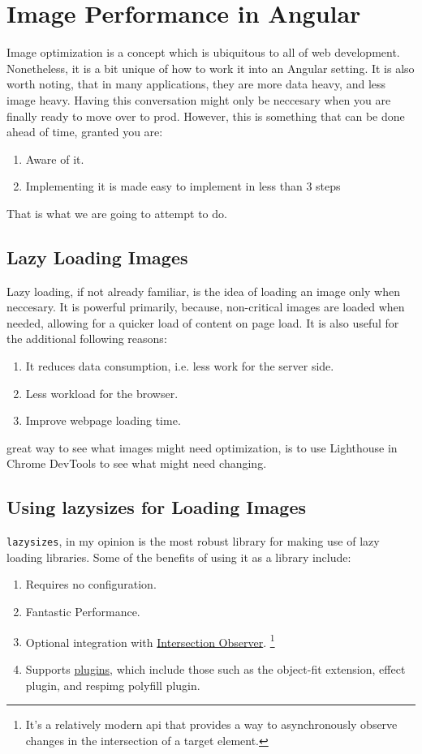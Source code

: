 \chapter{ Image Performance in Angular }

Image optimization is a concept which is ubiquitous to all of web development.
Nonetheless, it is a bit unique of how to work it into an Angular setting. It 
is also worth noting, that in many applications, they are more data heavy, and 
less image heavy. Having this conversation might only be neccesary when you 
are finally ready to move over to prod. However, this is something that can be 
done ahead of time, granted you are: 
\begin{enumerate}
  \item Aware of it. 
  \item Implementing it is made easy to implement in less than 3 steps
\end{enumerate}

That is what we are going to attempt to do. 

\section{Lazy Loading Images}
Lazy loading, if not already familiar, is the idea of loading an image only
when neccesary. It is powerful primarily, because, non-critical images are 
loaded when needed, allowing for a quicker load of content on page load. It 
is also useful for the additional following reasons: 
\begin{enumerate}
  \item It reduces data consumption, i.e. less work for the server side.
  \item Less workload for the browser. 
  \item Improve webpage loading time.
\end{enumerate}

great way to see what images might need optimization, is to use Lighthouse 
in Chrome DevTools to see what might need changing. 

\section{ Using lazysizes for Loading Images }
\lstinline{lazysizes}, in my opinion is the most robust library for making
use of lazy loading libraries. Some of the benefits of using it as a library 
include: 
\begin{enumerate}
  \item Requires no configuration.
  \item Fantastic Performance.
  \item Optional integration with \href{https://developer.mozilla.org/en-US/docs/Web/API/Intersection_Observer_API}{Intersection Observer}. 
  \footnote{It's a relatively modern api that provides a way to asynchronously observe 
  changes in the intersection of a target element.}
  \item Supports \href{https://github.com/aFarkas/lazysizes#plugins}{plugins}, 
  which include those such as the object-fit extension, effect plugin, and 
  respimg polyfill plugin.
\end{enumerate}

